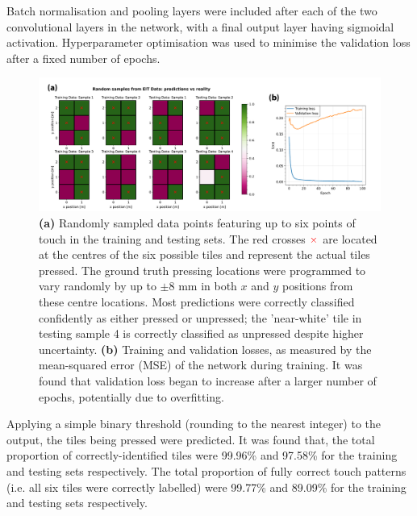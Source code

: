 Batch normalisation and pooling layers were included after each of the two convolutional layers in the network, with a final output layer having sigmoidal activation. Hyperparameter optimisation was used to minimise the validation loss after a fixed number of epochs.

\begin{figure}[htbp]
  \centering
  \includegraphics[width=0.9\columnwidth]{Images/Figure_4.pdf}
  \caption{\textbf{(a)} Randomly sampled data points featuring up to six points of touch in the training and testing sets. The red crosses $ {\textcolor{red}{\times}} $ are located at the centres of the six possible tiles and represent the actual tiles pressed. The ground truth pressing locations were programmed to vary randomly by up to $ \pm 8 $ mm in both $ x $ and $ y $ positions from these centre locations. Most predictions were correctly classified confidently as either pressed or unpressed; the 'near-white' tile in testing sample 4 is correctly classified as unpressed despite higher uncertainty. \textbf{(b)} Training and validation losses, as measured by the mean-squared error (MSE) of the network during training. It was found that validation loss began to increase after a larger number of epochs, potentially due to overfitting.}
  \label{fig:superposition}
\end{figure}

Applying a simple binary threshold (rounding to the nearest integer) to the output, the tiles being pressed were predicted. It was found that, the total proportion of correctly-identified tiles were 99.96\% and 97.58\% for the training and testing sets respectively. The total proportion of fully correct touch patterns (i.e. all six tiles were correctly labelled) were 99.77\% and 89.09\% for the training and testing sets respectively.

